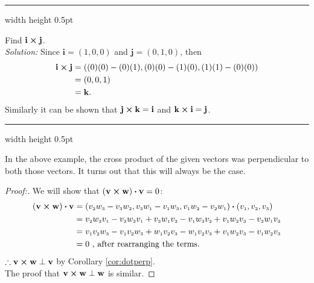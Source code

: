 \hrule width \textwidth height 0.5pt
\piccaption[]{}
\begin{exmp}\label{exmp:crossijk}
 Find $\textbf{i} \bm{\times} \textbf{j}$.\smallskip\\\emph{Solution:}
 Since $\textbf{i} = (1,0,0)$ and $\textbf{j} = (0,1,0)$, then
 \begin{align*}
  \textbf{i} \bm{\times} \textbf{j} &= ((0)(0) - (0)(1),(0)(0) - (1)(0),(1)(1) - (0)(0))\\
  &= (0,0,1)\\
  &= \textbf{k}.
 \end{align*}
Similarly it can be shown that $\textbf{j} \bm{\times} \textbf{k} = \textbf{i}$ and
$\textbf{k} \bm{\times} \textbf{i} = \textbf{j}$.
\end{exmp}
\hrule width \textwidth height 0.5pt
\medskip

In the above example, the cross product of the given vectors was perpendicular to both those vectors. It
turns out that this will always be the case.

\begin{proofbar}\begin{proof}[Proof:]
 We will show that $(\textbf{v} \bm{\times} \textbf{w}) \bm{\cdot} \textbf{v} = 0$:
 \begin{align*}
  (\textbf{v} \bm{\times} \textbf{w}) \bm{\cdot} \textbf{v} &= (v_{\scriptscriptstyle 2}w_{\scriptscriptstyle 3} -
  v_{\scriptscriptstyle 3}w_{\scriptscriptstyle 2}, v_{\scriptscriptstyle 3}w_{\scriptscriptstyle 1} - v_{\scriptscriptstyle 1}w_{\scriptscriptstyle 3}, v_{\scriptscriptstyle 1}w_{\scriptscriptstyle 2} -
  v_{\scriptscriptstyle 2}w_{\scriptscriptstyle 1}) \bm{\cdot} (v_{\scriptscriptstyle 1},v_{\scriptscriptstyle 2},v_{\scriptscriptstyle 3})\\
  &= v_{\scriptscriptstyle 2}w_{\scriptscriptstyle 3}v_{\scriptscriptstyle 1} - v_{\scriptscriptstyle 3}w_{\scriptscriptstyle 2}v_{\scriptscriptstyle 1} +
  v_{\scriptscriptstyle 3}w_{\scriptscriptstyle 1}v_{\scriptscriptstyle 2} - v_{\scriptscriptstyle 1}w_{\scriptscriptstyle 3}v_{\scriptscriptstyle 2} + v_{\scriptscriptstyle 1}w_{\scriptscriptstyle 2}v_{\scriptscriptstyle 3} -
  v_{\scriptscriptstyle 2}w_{\scriptscriptstyle 1}v_{\scriptscriptstyle 3}\\
  &= v_{\scriptscriptstyle 1}v_{\scriptscriptstyle 2}w_{\scriptscriptstyle 3} - v_{\scriptscriptstyle 1}v_{\scriptscriptstyle 2}w_{\scriptscriptstyle 3} + w_{\scriptscriptstyle 1}v_{\scriptscriptstyle 2}v_{\scriptscriptstyle 3} -
  w_{\scriptscriptstyle 1}v_{\scriptscriptstyle 2}v_{\scriptscriptstyle 3} + v_{\scriptscriptstyle 1}w_{\scriptscriptstyle 2}v_{\scriptscriptstyle 3} - v_{\scriptscriptstyle 1}w_{\scriptscriptstyle 2}v_{\scriptscriptstyle 3}\\
  &= 0 \text{~, after rearranging the terms.}
 \end{align*}
 $\therefore \textbf{v} \bm{\times} \textbf{w} \perp \textbf{v}$ by Corollary \ref{cor:dotperp}.\\
 The proof that $\textbf{v} \bm{\times} \textbf{w} \perp \textbf{w}$ is similar.
\end{proof}\end{proofbar}

